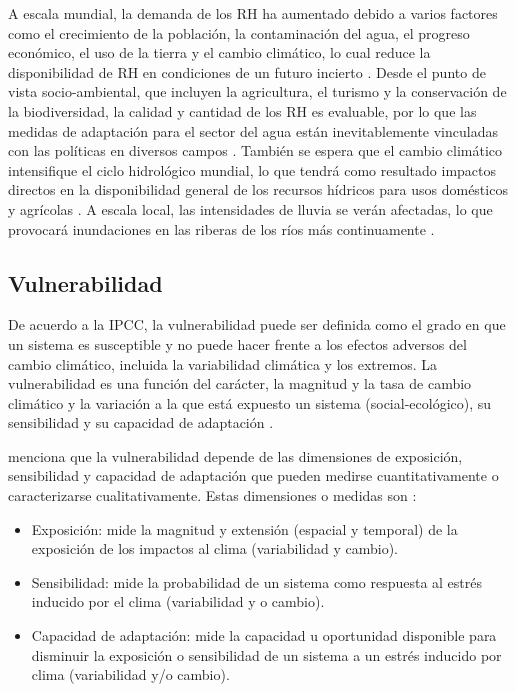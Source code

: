 \documentclass[12pt]{article}
\begin{document}
A escala mundial, la demanda de los RH ha aumentado debido a varios factores como el crecimiento de la población, la contaminación del agua, el progreso económico, el uso de la tierra y el cambio climático, lo cual reduce la disponibilidad de RH en condiciones de un futuro incierto \citep{Davies2011}. Desde el punto de vista socio-ambiental, que incluyen la agricultura, el turismo y la conservación de la biodiversidad, la calidad y cantidad de los RH es evaluable, por lo que las medidas de adaptación para el sector del agua están inevitablemente vinculadas con las políticas en diversos campos \citep{Field2014}. También se espera que el cambio climático intensifique el ciclo hidrológico mundial, lo que tendrá como resultado impactos directos en la disponibilidad general de los recursos hídricos para usos domésticos y agrícolas \citep{Huntington2006}. A escala local, las intensidades de lluvia se verán afectadas, lo que provocará inundaciones en las riberas de los ríos más continuamente \citep{Wilby2010}.

\subsection{Vulnerabilidad}

De acuerdo a la IPCC, la vulnerabilidad puede ser definida como el grado en que un sistema es susceptible y no puede hacer frente a los efectos adversos del cambio climático, incluida la variabilidad climática y los extremos. La vulnerabilidad es una función del carácter, la magnitud y la tasa de cambio climático y la variación a la que está expuesto un sistema (social-ecológico), su sensibilidad y su capacidad de adaptación \citep{parry2007climate}.

\citet{nelitz2013tools} menciona que la vulnerabilidad depende de las dimensiones de exposición, sensibilidad y capacidad de adaptación que pueden medirse cuantitativamente o caracterizarse cualitativamente. Estas dimensiones o medidas son \citep{glick2011scanning,fussel2006climate}:

\begin{itemize}
    \item Exposición: mide la magnitud y extensión (espacial y temporal) de la exposición de los impactos al clima (variabilidad y cambio).
    \item Sensibilidad: mide la probabilidad de un sistema como respuesta al estrés inducido por el clima (variabilidad y o cambio).
    \item Capacidad de adaptación: mide la capacidad u oportunidad disponible para disminuir la exposición o sensibilidad de un sistema a un estrés inducido por clima (variabilidad y/o cambio).
\end{itemize}
\end{document}
